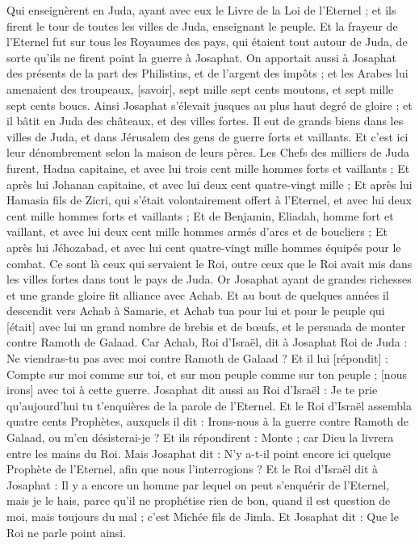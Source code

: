 \begin{multicols}{2}
Qui enseignèrent en Juda, ayant avec eux le Livre de la Loi de l'Eternel ; et ils firent le tour de toutes les villes de Juda, enseignant le peuple.
Et la frayeur de l'Eternel fut sur tous les Royaumes des pays, qui étaient tout autour de Juda, de sorte qu'ils ne firent point la guerre à Josaphat.
On apportait aussi à Josaphat des présents de la part des Philistins, et de l'argent des impôts ; et les Arabes lui amenaient des troupeaux, [savoir], sept mille sept cents moutons, et sept mille sept cents boucs.
Ainsi Josaphat s'élevait jusques au plus haut degré de gloire ; et il bâtit en Juda des châteaux, et des villes fortes.
Il eut de grands biens dans les villes de Juda, et dans Jérusalem des gens de guerre forts et vaillants.
Et c'est ici leur dénombrement selon la maison de leurs pères. Les Chefs des milliers de Juda furent, Hadna capitaine, et avec lui trois cent mille hommes forts et vaillants ;
Et après lui Johanan capitaine, et avec lui deux cent quatre-vingt mille ;
Et après lui Hamasia fils de Zicri, qui s'était volontairement offert à l'Eternel, et avec lui deux cent mille hommes forts et vaillants ;
Et de Benjamin, Eliadah, homme fort et vaillant, et avec lui deux cent mille hommes armés d'arcs et de boucliers ;
Et après lui Jéhozabad, et avec lui cent quatre-vingt mille hommes équipés pour le combat.
Ce sont là ceux qui servaient le Roi, outre ceux que le Roi avait mis dans les villes fortes dans tout le pays de Juda.
\VerseOne{}Or Josaphat ayant de grandes richesses et une grande gloire fit alliance avec Achab.
Et au bout de quelques années il descendit vers Achab à Samarie, et Achab tua pour lui et pour le peuple qui [était] avec lui un grand nombre de brebis et de bœufs, et le persuada de monter contre Ramoth de Galaad.
Car Achab, Roi d'Israël, dit à Josaphat Roi de Juda : Ne viendras-tu pas avec moi contre Ramoth de Galaad ? Et il lui [répondit] : Compte sur moi comme sur toi, et sur mon peuple comme sur ton peuple ; [nous irons] avec toi à cette guerre.
Josaphat dit aussi au Roi d'Israël : Je te prie qu'aujourd'hui tu t'enquières de la parole de l'Eternel.
Et le Roi d'Israël assembla quatre cents Prophètes, auxquels il dit : Irons-nous à la guerre contre Ramoth de Galaad, ou m'en désisterai-je ? Et ils répondirent : Monte ; car Dieu la livrera entre les mains du Roi.
Mais Josaphat dit : N'y a-t-il point encore ici quelque Prophète de l'Eternel, afin que nous l'interrogions ?
Et le Roi d'Israël dit à Josaphat : Il y a encore un homme par lequel on peut s'enquérir de l'Eternel, mais je le hais, parce qu'il ne prophétise rien de bon, quand il est question de moi, mais toujours du mal ; c'est Michée fils de Jimla. Et Josaphat dit : Que le Roi ne parle point ainsi.

\end{multicols}
